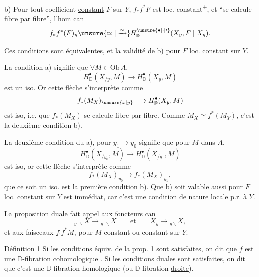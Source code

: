 b) Pour tout  coefficient  \uline{constant} $F$ sur $Y$, $f_*f^*F$ est loc. constant\textsuperscript{+}, et ``se calcule fibre par fibre'', l'hom can
\[
f_* f^*(F)_y \unsure{\simeq|\xrightarrow{\sim}} H^{\unsure{\bullet|\cdot|\prime}}_{\mathbb D}(X_y,F\mid X_y).
\]


Ces conditions sont équivalentes, et   la validité de b) pour  $F$ \uline{loc.} constant sur $Y$.

La  condition  a) signifie que  $\forall M\in\mathrm{Ob}\,A$, 
\[
H^\bullet_{\mathbb D}(X_{/y},M)\longrightarrow H^\bullet_{\mathbb D}(X_y,M)
\]
est un iso. Or cette flèche s'interprète comme
\[
f_*(M_X)_{\unsure{x|y}}\longrightarrow H^\bullet_{\mathbb D}(X_y,M)
\]
est iso, i.e. que $f_*(M_X)$ se calcule fibre par fibre. Comme $M_X\simeq f^*(M_Y)$, c'est la deuxième condition b).

La deuxième condition du a), pour $y_1\longrightarrow y_0$ signifie que pour $M$ dans $A$,
\[
H^\bullet_{\mathbb D}(X_{/y_0},M)\longrightarrow H^\bullet_{\mathbb D}(X_{/y_1},M)
\]
est iso,  or cette flèche s'interprète comme
\[
f_*(M_X)_{y_0}\longrightarrow f_*(M_X)_{y_1},
\]
que ce soit  un iso. est la première condition b). Que b) soit valable aussi pour $F$ loc. constant sur $Y$ est immédiat, car c'est une condition de nature locale p.r. à $Y$.

La proposition duale fait appel aux foncteurs can
\[
{}_{y_0\backslash}X\longrightarrow {}_{y_1\backslash}X
\qquad\text{et}\qquad X_y\longrightarrow {}_{y\backslash}X,
\]
et aux faisceaux $f_! f^*M$, pour $M$ constant ou  constant sur $Y$.

\uline{Définition 1} Si les conditions équiv. de la prop. 1 sont satisfaites, on dit que $f$ est une $\mathbb D$-fibration cohomologique  . Si les conditions duales sont satisfaites, on dit que c'est une $\mathbb D$-fibration homologique (ou $\mathbb D$-fibration \uline{droite}).

